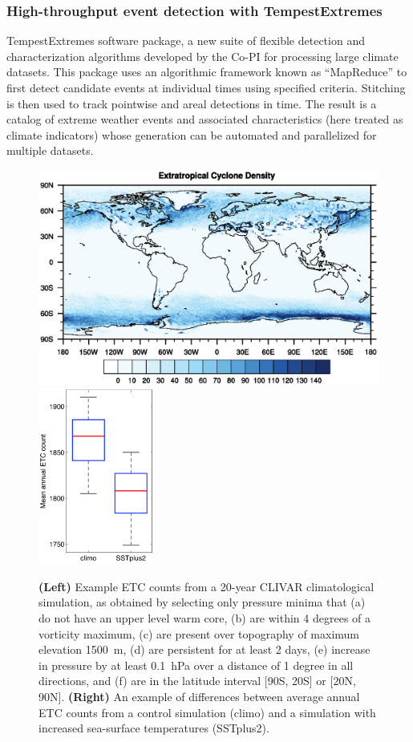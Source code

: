 \documentclass[11pt]{article}
\begin{document}
\subsubsection{High-throughput event detection with TempestExtremes} \label{sec:TempestExtremes}

TempestExtremes software package, a new suite of flexible detection and characterization algorithms developed by the Co-PI for processing large climate datasets. This package uses an algorithmic framework known as ``MapReduce'' to first detect candidate events at individual times using specified criteria. Stitching is then used to track pointwise and areal detections in time. The result is a catalog of extreme weather events and associated characteristics (here treated as climate indicators) whose generation can be automated and parallelized for multiple datasets.

\begin{figure}[p]
\begin{center}
\includegraphics[trim=0.5cm 3.5cm 1cm 4.5cm, clip=true, width=4.5in]{density_plot}
\includegraphics[width=1.5in]{ETCChanges.png}
\end{center}
\caption{\textbf{(Left)} Example ETC counts from a 20-year CLIVAR climatological simulation, as obtained by selecting only pressure minima that (a) do not have an upper level warm core, (b) are within 4 degrees of a vorticity maximum, (c) are present over topography of maximum elevation 1500\ m, (d) are persistent for at least 2 days, (e) increase in pressure by  at least 0.1\ hPa over a distance of 1 degree in all directions, and (f) are in the latitude interval [90S, 20S] or [20N, 90N].  \textbf{(Right)} An example of differences between average annual ETC counts from a control simulation (climo) and a simulation with increased sea-surface temperatures (SSTplus2).} \label{fig:DensityPlot}
\end{figure}
\end{document}
